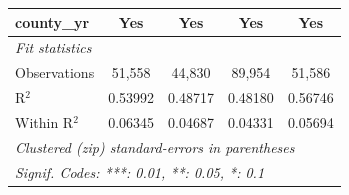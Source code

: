 \begin{tabular}{lcccc}
   county\_yr                    & Yes             & Yes             & Yes             & Yes\\  
   \midrule
   \emph{Fit statistics}\\
   Observations                  & 51,558          & 44,830          & 89,954          & 51,586\\  
   R$^2$                         & 0.53992         & 0.48717         & 0.48180         & 0.56746\\  
   Within R$^2$                  & 0.06345         & 0.04687         & 0.04331         & 0.05694\\  
   \midrule \midrule
   \multicolumn{5}{l}{\emph{Clustered (zip) standard-errors in parentheses}}\\
   \multicolumn{5}{l}{\emph{Signif. Codes: ***: 0.01, **: 0.05, *: 0.1}}\\
\end{tabular}
\par\endgroup
